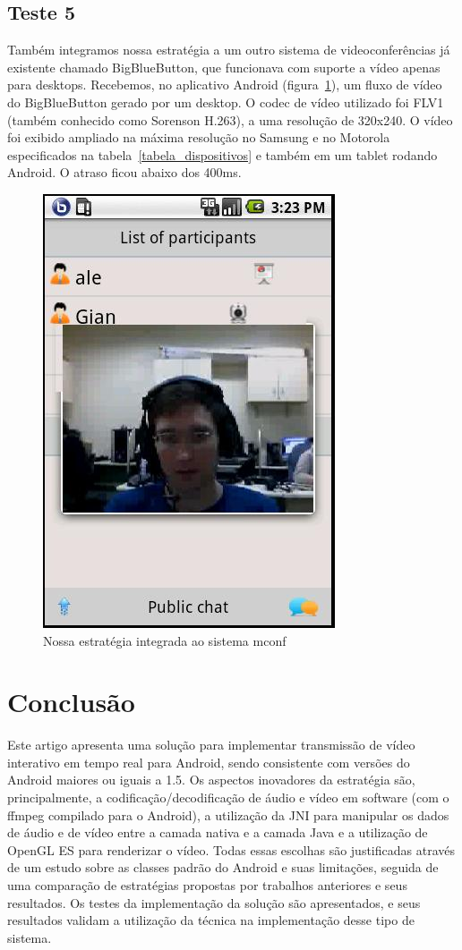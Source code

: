 \documentclass{acm_proc_article-sp}
\begin{document}
\subsection{Teste 5}
Também integramos nossa estratégia a um outro sistema de videoconferências já existente chamado BigBlueButton, que funcionava com suporte a vídeo apenas para desktops. Recebemos, no aplicativo Android (figura~\ref{figura_mconf}), um fluxo de vídeo do BigBlueButton gerado por um desktop. O codec de vídeo utilizado foi FLV1 (também conhecido como Sorenson H.263), a uma resolução de 320x240. O vídeo foi exibido ampliado na máxima resolução no Samsung e no Motorola especificados na tabela~\ref{tabela_dispositivos} e também em um tablet rodando Android. O atraso ficou abaixo dos 400ms.
\begin{figure}
 \centering
 \label{figura_mconf}
 \includegraphics[scale=0.4]{./mconf.jpg}
\caption{Nossa estratégia integrada ao sistema mconf}
\end{figure}


\section{Conclusão}

Este artigo apresenta uma solução para implementar transmissão de vídeo interativo em tempo real para Android, sendo consistente com versões do Android maiores ou iguais a 1.5. Os aspectos inovadores da estratégia são, principalmente, a codificação/decodificação de áudio e vídeo em software (com o ffmpeg compilado para o Android), a utilização da JNI para manipular os dados de áudio e de vídeo entre a camada nativa e a camada Java e a utilização de OpenGL ES para renderizar o vídeo. Todas essas escolhas são justificadas através de um estudo sobre as classes padrão do Android e suas limitações, seguida de uma comparação de estratégias propostas por trabalhos anteriores e seus resultados. Os testes da implementação da solução são apresentados, e seus resultados validam a utilização da técnica na implementação desse tipo de sistema.
\end{document}
